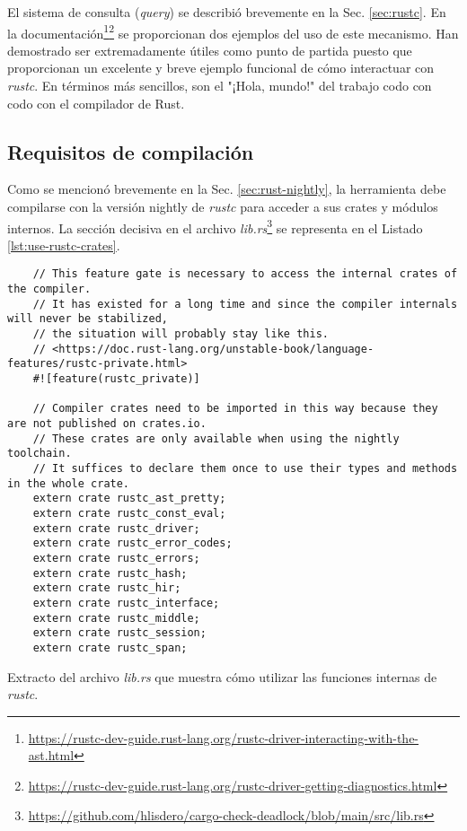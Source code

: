 El sistema de consulta (\textit{query}) se describió brevemente en la Sec. \ref{sec:rustc}.
En la documentación\footnote{\url{https://rustc-dev-guide.rust-lang.org/rustc-driver-interacting-with-the-ast.html}}\footnote{\url{https://rustc-dev-guide.rust-lang.org/rustc-driver-getting-diagnostics.html}}
se proporcionan dos ejemplos del uso de este mecanismo. Han demostrado ser extremadamente
útiles como punto de partida puesto que proporcionan un excelente y breve ejemplo funcional de
cómo interactuar con \emph{rustc}.
En términos más sencillos, son el "¡Hola, mundo!" del trabajo codo con codo con el compilador de Rust.

\subsection{Requisitos de compilación}

Como se mencionó brevemente en la Sec. \ref{sec:rust-nightly}, la herramienta debe compilarse con la versión
nightly de \emph{rustc} para acceder a sus crates y módulos internos. La sección decisiva en el archivo
\emph{lib.rs}\footnote{\url{https://github.com/hlisdero/cargo-check-deadlock/blob/main/src/lib.rs}}
se representa en el Listado \ref{lst:use-rustc-crates}.

\begin{listing}[!htb]
  \begin{verbatim}
    // This feature gate is necessary to access the internal crates of the compiler.
    // It has existed for a long time and since the compiler internals will never be stabilized,
    // the situation will probably stay like this.
    // <https://doc.rust-lang.org/unstable-book/language-features/rustc-private.html>
    #![feature(rustc_private)]
    
    // Compiler crates need to be imported in this way because they are not published on crates.io.
    // These crates are only available when using the nightly toolchain.
    // It suffices to declare them once to use their types and methods in the whole crate.
    extern crate rustc_ast_pretty;
    extern crate rustc_const_eval;
    extern crate rustc_driver;
    extern crate rustc_error_codes;
    extern crate rustc_errors;
    extern crate rustc_hash;
    extern crate rustc_hir;
    extern crate rustc_interface;
    extern crate rustc_middle;
    extern crate rustc_session;
    extern crate rustc_span;
  \end{verbatim}
  \caption{Extracto del archivo \emph{lib.rs} que muestra cómo utilizar las funciones internas de \emph{rustc}.}
  \label{lst:use-rustc-crates}
\end{listing}

